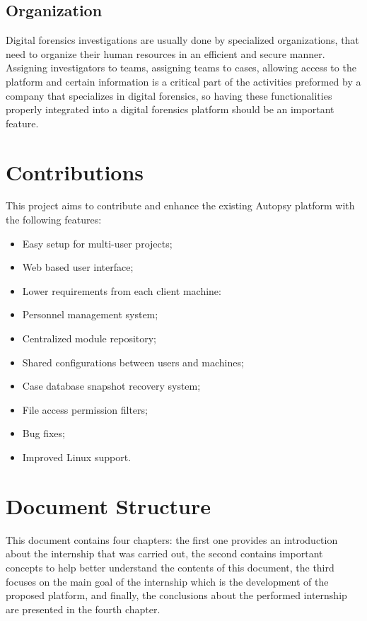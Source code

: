 \subsection{Organization}

Digital forensics investigations are usually done by specialized organizations, that need to organize their human resources in an efficient and secure manner.
Assigning investigators to teams, assigning teams to cases, allowing access to the platform and certain information is a critical part of the activities preformed by
a company that specializes in digital forensics, so having these functionalities properly integrated into a digital forensics platform should be an important feature.

\section{Contributions}

This project aims to contribute and enhance the existing Autopsy platform with the following features:

\begin{itemize}
 \item Easy setup for multi-user projects;
 \item Web based user interface;
 \item Lower requirements from each client machine:
 \item Personnel management system;
 \item Centralized module repository;
 \item Shared configurations between users and machines;
 \item Case database snapshot recovery system;
 \item File access permission filters;
 \item Bug fixes;
 \item Improved Linux \cite{linux} support.
\end{itemize}

\section{Document Structure}

This document contains four chapters: the first one provides an introduction about the internship that was carried out, 
the second contains important concepts to help better understand the contents of this document, the third focuses on the main goal of the internship which is the development
of the proposed platform, and finally, the conclusions about the performed internship are presented in the fourth chapter.
